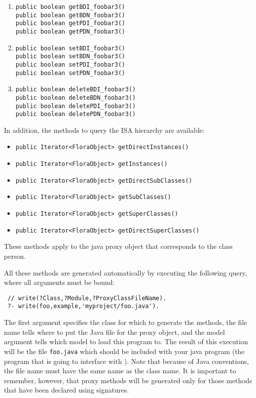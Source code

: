 \begin{enumerate}
\item  {\tt public boolean getBDI\_foobar3()}   \\
  {\tt public boolean getBDN\_foobar3()} \\
  {\tt public boolean getPDI\_foobar3()}   \\
  {\tt public boolean getPDN\_foobar3()}
\item {\tt public boolean setBDI\_foobar3()}   \\
  {\tt public boolean setBDN\_foobar3()} \\
  {\tt public boolean setPDI\_foobar3()}   \\
  {\tt public boolean setPDN\_foobar3()}
\item {\tt public boolean deleteBDI\_foobar3()}  \\
  {\tt public boolean deleteBDN\_foobar3()}  \\
  {\tt public boolean deletePDI\_foobar3()}  \\
  {\tt public boolean deletePDN\_foobar3()}  
\end{enumerate}

In addition, the methods to query the ISA hierarchy are available:
\begin{itemize}
\item  {\tt public Iterator<FloraObject> getDirectInstances()}
\item  {\tt public Iterator<FloraObject> getInstances()}
\item  {\tt public Iterator<FloraObject> getDirectSubClasses()}
\item  {\tt public Iterator<FloraObject> getSubClasses()}
\item   {\tt public Iterator<FloraObject> getSuperClasses()}   
\item   {\tt public Iterator<FloraObject> getDirectSuperClasses()}   
\end{itemize}
These methods apply to the java proxy object that corresponds to the \fl
class person.

All these methods are generated automatically by executing the following
\FLORA query, where all arguments must be bound:
\begin{verbatim}
 // write(?Class,?Module,?ProxyClassFileName).
 ?- write(foo,example,'myproject/foo.java').
\end{verbatim}
The first argument specifies the class for which to generate the methods,
the file name tells where to put the Java file for the proxy object,
and the model argument tells which \FLORA model to load this program to. The
result of this execution will be the file {\tt foo.java} which should be
included with your java program (the program that is going to interface with
\FLORA). Note that because of Java conventions, the file name must have
the same name as the class name.
It is important to remember, however, that proxy methods will
be generated only for those \fl methods that have been declared using
signatures.

